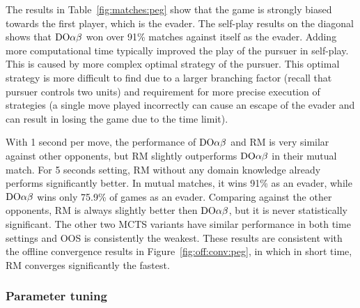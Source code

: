 The results in Table~\ref{fig:matches:peg} show that the game is strongly biased towards the first player, which is the evader. The self-play results on the diagonal shows that $\textrm{DO}\alpha\beta$ won over 91\% matches against itself as the evader. Adding more computational time typically improved the play of the pursuer in self-play. This is caused by more complex optimal strategy of the pursuer. This optimal strategy is more difficult to find due to a larger branching factor (recall that pursuer controls two units) and requirement for more precise execution of strategies (a single move played incorrectly can cause an escape of the evader and can result in losing the game due to the time limit).

With 1 second per move, the performance of $\textrm{DO}\alpha\beta$ and RM is very similar against other opponents, but RM slightly outperforms $\textrm{DO}\alpha\beta$ in their mutual match.
For 5 seconds setting, RM without any domain knowledge already performs significantly better. In mutual matches, it wins 91\% as an evader, while $\textrm{DO}\alpha\beta$ wins only 75.9\% of games as an evader.
Comparing against the other opponents, RM is always slightly better then $\textrm{DO}\alpha\beta$, but it is never statistically significant. The other two MCTS variants have similar performance in both time settings and OOS is consistently the weakest. 
These results are consistent with the offline convergence results in Figure~\ref{fig:off:conv:peg}, in which in short time, RM converges significantly the fastest.

\subsubsection{Parameter tuning}\label{sec:eval:online:tuning}

